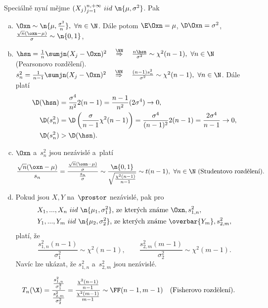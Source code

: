 \begin{theorem}Speciálně nyní mějme $(X_j)_{j=1}^{n,+\infty}~iid~\n{\mu,\sigma^2}$. Pak \begin{enumerate}[a)]
		\item $\Oxn\sim\n{\mu,\frac{\sigma^2}{n}},~\forall n\in\N$. Dále potom $\E \Oxn=\mu$, $\D\Oxn=\sigma^2$, $\frac{\sqrt{n}(\oxn-\mu)}{\sigma}\sim\n{0,1}$,
		\item $\hsn=\frac{1}{n}\sumjn(X_j-\Oxn)^2\quad \stackrel{\NN}{\Rightarrow}\quad \frac{n\hsn}{\sigma^2}\sim\chi^2(n-1),~\forall n\in\N$ (Pearsonovo rozdělení).\newline
		$s_n^2=\frac{1}{n-1}\sumjn(X_j-\Oxn)^2\quad \stackrel{\NN}{\Rightarrow}\quad \frac{(n-1) s_n^2}{\sigma^2}\sim\chi^2(n-1),~\forall n\in\N$. Dále platí
		\[
		\begin{split}
		\D(\hsn)&=\frac{\sigma^4}{n^2}2(n-1)=\frac{n-1}{n^2}(2\sigma^4)\to 0, \\
		\D(s_n^2)&=\D\left( \frac{\sigma}{n-1}\chi^2(n-1) \right)=\frac{\sigma^4}{(n-1)^2}2(n-1)=\frac{2\sigma^4}{n-1}\to0, \\
		\D(s_n^2)&>\D(\hsn).
		\end{split}
		\]
		\item $\Oxn$ a~$s_n^2$ jsou nezávislé a~platí 
		$$ \frac{\sqrt{n}(\oxn-\mu)}{s_n}=\frac{\frac{\sqrt{n}(\oxn-\mu)}{\sigma}}{\frac{s_n}{\sigma}}\sim\frac{\n{0,1}}{\sqrt{\frac{\chi^2(n-1)}{n-1}}}\sim t(n-1),~\forall n\in\N \text{ (Studentovo rozdělení).}$$
		\item Pokud jsou $X,Y$ na~$\prostor$ nezávislé, pak pro
		\begin{align*}
		&X_1,...,X_n~iid~\n{\mu_1,\sigma_1^2}\text{, ze~kterých známe } \Oxn,s_{1,n}^2, \\
		&Y_1,...,Y_m~iid~\n{\mu_2,\sigma_2^2}\text{, ze~kterých známe }  \overbar{\rule{0ex}{1.8ex}Y_m},s_{2,m}^2,
		\end{align*} platí, že 
		$$ \frac{s_{1,n}^2(n-1)}{\sigma_1^2}\sim\chi^2(n-1),\qquad \frac{s_{2,m}^2(m-1)}{\sigma_2^2}\sim\chi^2(m-1). $$
		Navíc lze ukázat, že $s_{1,n}^2$ a~$s_{2,m}^2$ jsou nezávislé.
	\end{enumerate}
\end{theorem}
\begin{dusl}
	$$ T_n(\X)=\frac{\frac{s_{1,n}^2}{\sigma_1^2}}{\frac{s_{2,m}^2}{\sigma_2^2}}=\frac{\frac{\chi^2(n-1)}{n-1}}{\frac{\chi^2(m-1)}{m-1}}\sim\FF(n-1,m-1)\quad\text{(Fisherovo rozdělení).} $$
\end{dusl}

